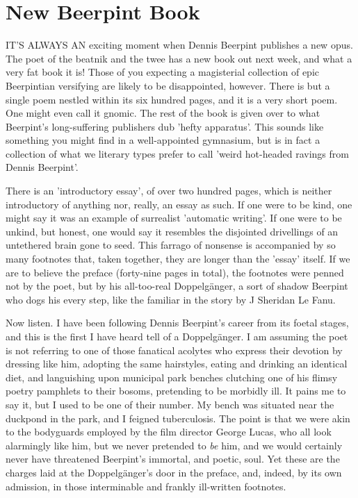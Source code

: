 \chapter{New Beerpint Book}

IT'S ALWAYS AN exciting moment when Dennis Beerpint publishes a new opus. The poet of the beatnik and the twee has a new book out next week, and what a very fat book it is! Those of you expecting a magisterial collection of epic Beerpintian versifying are likely to be disappointed, however. There is but a single poem nestled within its six hundred pages, and it is a very short poem. One might even call it gnomic. The rest of the book is given over to what Beerpint's long-suffering publishers dub 'hefty apparatus'. This sounds like something you might find in a well-appointed gymnasium, but is in fact a collection of what we literary types prefer to call 'weird hot-headed ravings from Dennis Beerpint'.

There is an 'introductory essay', of over two hundred pages, which is neither introductory of anything nor, really, an essay as such. If one were to be kind, one might say it was an example of surrealist 'automatic writing'. If one were to be unkind, but honest, one would say it resembles the disjointed drivellings of an untethered brain gone to seed. This farrago of nonsense is accompanied by so many footnotes that, taken together, they are longer than the 'essay' itself. If we are to believe the preface (forty-nine pages in total), the footnotes were penned not by the poet, but by his all-too-real Doppelg\"{a}nger, a sort of shadow Beerpint who dogs his every step, like the familiar in the story by J Sheridan Le Fanu.

Now listen. I have been following Dennis Beerpint's career from its foetal stages, and this is the first I have heard tell of a Doppelg\"{a}nger. I am assuming the poet is not referring to one of those fanatical acolytes who express their devotion by dressing like him, adopting the same hairstyles, eating and drinking an identical diet, and languishing upon municipal park benches clutching one of his flimsy poetry pamphlets to their bosoms, pretending to be morbidly ill. It pains me to say it, but I used to be one of their number. My bench was situated near the duckpond in the park, and I feigned tuberculosis. The point is that we were akin to the bodyguards employed by the film director George Lucas, who all look alarmingly like him, but we never pretended to \emph{be} him, and we would certainly never have threatened Beerpint's immortal, and poetic, soul. Yet these are the charges laid at the Doppelg\"{a}nger's door in the preface, and, indeed, by its own admission, in those interminable and frankly ill-written footnotes.

